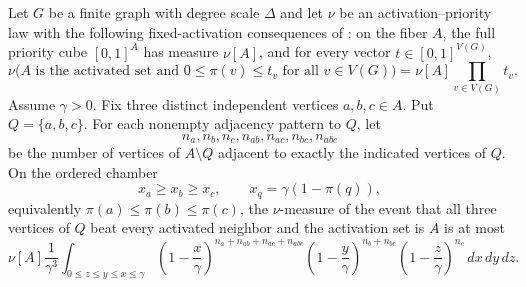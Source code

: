 \begin{helper}
Let $G$ be a finite graph with degree scale $\Delta$ and let $\nu$ be an
activation--priority law with the following fixed-activation consequences of
: on the fiber $A$, the full priority
cube $[0,1]^A$ has measure $\nu[A]$, and for every vector
$t\in[0,1]^{V(G)}$,
\[
\nu\bigl(A\text{ is the activated set and }0\le \pi(v)\le t_v
\text{ for all }v\in V(G)\bigr)
=\nu[A]\prod_{v\in V(G)}t_v .
\]
Assume $\gamma>0$.  Fix three distinct independent vertices $a,b,c\in A$.
Put $Q=\{a,b,c\}$.  For each nonempty adjacency pattern to $Q$, let
\[
n_a,n_b,n_c,n_{ab},n_{ac},n_{bc},n_{abc}
\]
be the number of vertices of $A\setminus Q$ adjacent to exactly the indicated
vertices of $Q$.  On the ordered chamber
\[
x_a\ge x_b\ge x_c,\qquad x_q=\gamma(1-\pi(q)),
\]
equivalently $\pi(a)\le\pi(b)\le\pi(c)$, the $\nu$-measure of the event that
all three vertices of $Q$ beat every activated neighbor and the activation set
is $A$ is at most
\[
\nu[A]\frac{1}{\gamma^3}
\int_{0\le z\le y\le x\le \gamma}
\left(1-\frac{x}{\gamma}\right)^{n_a+n_{ab}+n_{ac}+n_{abc}}
\left(1-\frac{y}{\gamma}\right)^{n_b+n_{bc}}
\left(1-\frac{z}{\gamma}\right)^{n_c}\,dx\,dy\,dz .
\]
\end{helper}
